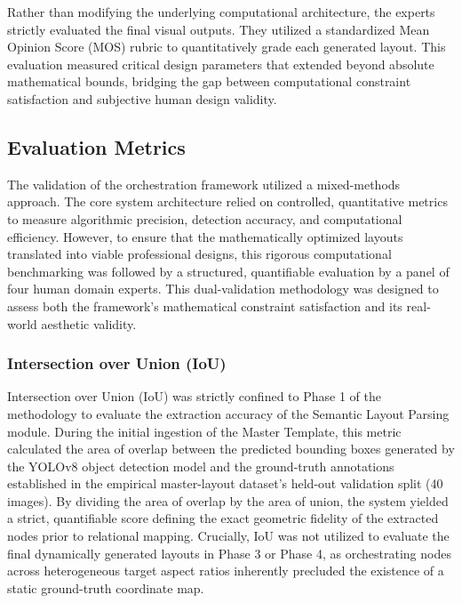 \begin{refsection}
Rather than modifying the underlying computational architecture, the experts strictly evaluated the final visual outputs. They utilized a standardized Mean Opinion Score (MOS) rubric to quantitatively grade each generated layout. This evaluation measured critical design parameters that extended beyond absolute mathematical bounds, bridging the gap between computational constraint satisfaction and subjective human design validity.

\subsection{Evaluation Metrics}
The validation of the orchestration framework utilized a mixed-methods approach. The core system architecture relied on controlled, quantitative metrics to measure algorithmic precision, detection accuracy, and computational efficiency. However, to ensure that the mathematically optimized layouts translated into viable professional designs, this rigorous computational benchmarking was followed by a structured, quantifiable evaluation by a panel of four human domain experts. This dual-validation methodology was designed to assess both the framework's mathematical constraint satisfaction and its real-world aesthetic validity.

\subsubsection{Intersection over Union (IoU)}
Intersection over Union (IoU) was strictly confined to Phase 1 of the methodology to evaluate the extraction accuracy of the Semantic Layout Parsing module. During the initial ingestion of the Master Template, this metric calculated the area of overlap between the predicted bounding boxes generated by the YOLOv8 object detection model and the ground-truth annotations established in the empirical master-layout dataset's held-out validation split (40 images). By dividing the area of overlap by the area of union, the system yielded a strict, quantifiable score defining the exact geometric fidelity of the extracted nodes prior to relational mapping. Crucially, IoU was not utilized to evaluate the final dynamically generated layouts in Phase 3 or Phase 4, as orchestrating nodes across heterogeneous target aspect ratios inherently precluded the existence of a static ground-truth coordinate map.


\end{refsection}

